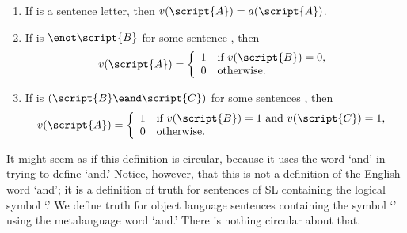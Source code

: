 \begin{enumerate}
\item If  is a sentence letter, then $v(\script{A})=a(\script{A})$.


\item If  is ${\enot}\script{B}$ for some sentence , then
\begin{displaymath}v(\script{A}) =
	\left\{\begin{array}{ll}
	1 & \mbox{if $v(\script{B}) = 0$},\\
	0 & \mbox{otherwise.}
	\end{array}\right.
\end{displaymath}

\item If  is $(\script{B}\eand\script{C})$ for some sentences , then
\begin{displaymath}v(\script{A}) =
	\left\{\begin{array}{ll}
	1 & \mbox{if $v(\script{B}) = 1$ and $v(\script{C}) = 1$,}\\
	0 & \mbox{otherwise.}
	\end{array}\right.
\end{displaymath}
\end{enumerate}

It might seem as if this definition is circular, because it uses the word `and' in trying to define `and.' Notice, however, that this is not a definition of the English word `and'; it is a definition of truth for sentences of SL containing the logical symbol `\eand.' We define truth for object language sentences containing the symbol `\eand' using the metalanguage word `and.' There is nothing circular about that.

